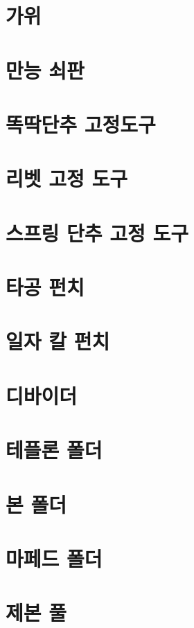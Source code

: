 \documentclass[12pt, a4paper, oneside]{book}
\begin{document}
	\section{가위}

	\section{만능 쇠판}

	\section{똑딱단추 고정도구}

	\section{리벳 고정 도구}

	\section{스프링 단추 고정 도구}

	\section{타공 펀치}

	\section{일자 칼 펀치}

	\section{디바이더}


	\section{테플론 폴더}

	\section{본 폴더}

	\section{마페드 폴더}


	\section{제본 풀}
\end{document}
